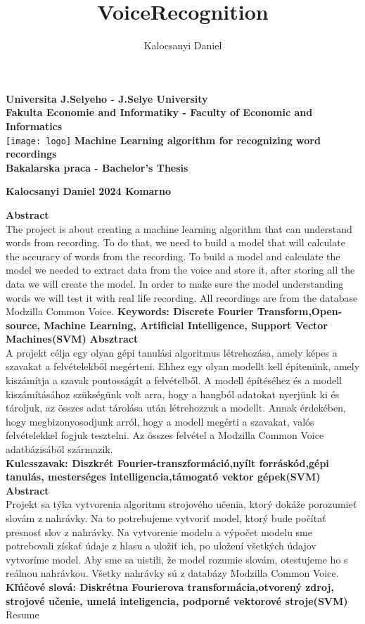 \documentclass[english,12pt,oneside,a4paper]{article}
\title{VoiceRecognition}
\author{Kalocsanyi Daniel}
\begin{document}
	\begin{center}
		\textbf{Universita J.Selyeho - J.Selye University}
		\\
		\textbf{Fakulta Economie and Informatiky - Faculty of Economic and Informatics}
		\\
		\texttt{[image: logo]}
		\hspace{8cm}
		\textbf{Machine Learning algorithm for recognizing word recordings}
		\\
		\textbf{Bakalarska praca - Bachelor's Thesis}
	\begin{flushleft}
		\vspace{11cm}
		\textbf{Kalocsanyi Daniel 2024 Komarno}
	\end{flushleft}
	\newpage
	\textbf{Abstract}
	\\
	The project is about creating a machine learning algorithm that can understand words from recording. To do that, we need to build a model that will calculate the accuracy of words from the recording. To build a model and calculate the model we needed to extract data from the voice and store it, after storing all the data we will create the model. In order to make sure the model understanding words we will test it with real life recording. All recordings are from the database Modzilla Common Voice.
	\textbf{Keywords: Discrete Fourier Transform,Open-source, Machine Learning, Artificial Intelligence, Support Vector Machines(SVM)} 
	\newpage
	\textbf{Absztract}
	\\
	A projekt célja egy olyan gépi tanulási algoritmus létrehozása, amely képes a szavakat a felvételekből megérteni. Ehhez egy olyan modellt kell építenünk, amely kiszámítja a szavak pontosságát a felvételből. A modell építéséhez és a modell kiszámításához szükségünk volt arra, hogy a hangból adatokat nyerjünk ki és tároljuk, az összes adat tárolása után létrehozzuk a modellt. Annak érdekében, hogy megbizonyosodjunk arról, hogy a modell megérti a szavakat, valós felvételekkel fogjuk tesztelni. Az összes felvétel a Modzilla Common Voice adatbázisából származik.\\
	\textbf{Kulcsszavak: Diszkrét Fourier-transzformáció,nyílt forráskód,gépi tanulás, mesterséges intelligencia,támogató vektor gépek(SVM)} 
	\newpage
	\textbf{Abstract}
	\\
	Projekt sa týka vytvorenia algoritmu strojového učenia, ktorý dokáže porozumieť slovám z nahrávky. Na to potrebujeme vytvoriť model, ktorý bude počítať presnosť slov z nahrávky. Na vytvorenie modelu a výpočet modelu sme potrebovali získať údaje z hlasu a uložiť ich, po uložení všetkých údajov vytvoríme model. Aby sme sa uistili, že model rozumie slovám, otestujeme ho s reálnou nahrávkou. Všetky nahrávky sú z databázy Modzilla Common Voice.\\
	\textbf{Kľúčové slová: Diskrétna Fourierova transformácia,otvorený zdroj, strojové učenie, umelá inteligencia, podporné vektorové stroje(SVM)}
	\newpage
	Resume
	\newpage
	\newpage
	\tableofcontents
	\newpage

\end{center}
\end{document}

